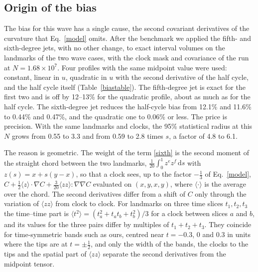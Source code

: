 \documentclass[11pt,a4paper]{article}
\newcommand{\dd}{\mathrm d}
\begin{document}
\subsection{Origin of the bias}\label{bias}
The bias for this wave has a single cause, the second covariant derivatives
of the curvature that Eq.~\eqref{model} omits. After the benchmark we applied
the fifth- and sixth-degree jets, with no other change, to exact interval
volumes on the landmarks of the two wave cases, with the clock mask and
covariance of the run at $N=1.68\times10^7$. Four profiles with the same
midpoint value were used: constant, linear in $u$, quadratic in $u$ with the
second derivative of the half cycle, and the half cycle itself
(Table~\ref{biastable}). The fifth-degree jet is exact for the first two and
is off by 12--13\% for the quadratic profile, about as much as for the half
cycle. The sixth-degree jet reduces the half-cycle bias from 12.1\% and
11.6\% to 0.44\% and 0.47\%, and the quadratic one to 0.06\% or less. The
price is precision. With the same landmarks and clocks, the 95\% statistical
radius at this $N$ grows from 0.55 to 3.3 and from 0.59 to 2.8 times $s$, a
factor of 4.8 to 6.1.

The reason is geometric. The weight of the term \eqref{sixth} is the second
moment of the straight chord between the two landmarks,
$\tfrac1{20}\int_0^1z^ez^f\,\dd s$ with $z(s)=x+s(y-x)$, so that a clock
sees, up to the factor $-\tfrac13$ of Eq.~\eqref{model},
$C+\tfrac12\langle z\rangle\!\cdot\!\nabla C
+\tfrac3{20}\langle zz\rangle\!:\!\nabla\nabla C$ evaluated on $(x,y,x,y)$,
where $\langle\cdot\rangle$ is the average over the chord. The second
derivatives differ from a shift of $C$ only through the variation of
$\langle zz\rangle$ from clock to clock. For landmarks on three time slices
$t_1,t_2,t_3$ the time--time part is $\langle t^2\rangle=(t_a^2+t_at_b+t_b^2)/3$
for a clock between slices $a$ and $b$, and its values for the three pairs
differ by multiples of $t_1+t_2+t_3$. They coincide for time-symmetric bands
such as ours, centred near $t=-0.3$, $0$ and $0.3$ in units where the tips
are at $t=\pm\tfrac12$, and only the width of the bands, the clocks to the
tips and the spatial part of $\langle zz\rangle$ separate the second
derivatives from the midpoint tensor.
\end{document}
